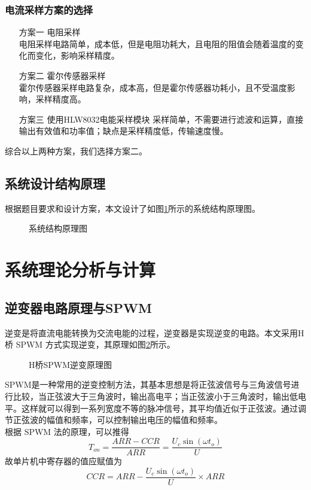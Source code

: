 \documentclass[a4paper,12pt]{article}
\begin{document}
\subsubsection{电流采样方案的选择}
\begin{enumerate}
    \item[方案一] 电阻采样 \\ 电阻采样电路简单，成本低，但是电阻功耗大，且电阻的阻值会随着温度的变化而变化，影响采样精度。
    \item[方案二] 霍尔传感器采样 \\ 霍尔传感器采样电路复杂，成本高，但是霍尔传感器功耗小，且不受温度影响，采样精度高。
    \item[方案三] 使用HLW8032电能采样模块  采样简单，不需要进行滤波和运算，直接输出有效值和功率值；缺点是采样精度低，传输速度慢。
\end{enumerate}
综合以上两种方案，我们选择方案二。

\subsection{系统设计结构原理}
根据题目要求和设计方案，本文设计了如图\ref{fig2}所示的系统结构原理图。
\begin{figure}[htbp]
\centering
\caption{系统结构原理图}
\label{fig2}
\end{figure}

\newpage

\section{系统理论分析与计算}
\subsection{逆变器电路原理与SPWM}
逆变是将直流电能转换为交流电能的过程，逆变器是实现逆变的电路。本文采用H桥 SPWM 方式实现逆变，其原理如图\ref{fig3}所示。
\begin{figure}[htbp]
\centering
\caption{H桥SPWM逆变原理图}
\label{fig3}
\end{figure}

SPWM是一种常用的逆变控制方法，其基本思想是将正弦波信号与三角波信号进行比较，当正弦波大于三角波时，输出高电平；当正弦波小于三角波时，输出低电平。这样就可以得到一系列宽度不等的脉冲信号，其平均值近似于正弦波。通过调节正弦波的幅值和频率，可以控制输出电压的幅值和频率。
\\
根据 SPWM 法的原理，可以推得
$$T_{on}=\frac{ARR-CCR}{ARR}=\frac{U_c\sin(\omega t_o)}{U}$$
故单片机中寄存器的值应赋值为
$$CCR=ARR-\frac{U_c\sin (\omega t_o)}{U}\times ARR$$
\end{document}
